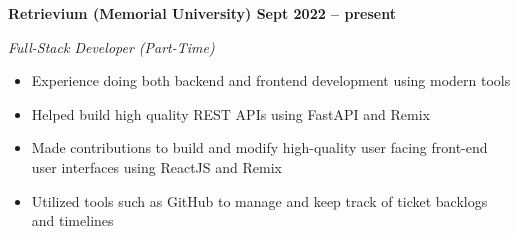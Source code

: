\vspace{0.1cm}
\textbf{Retrievium (Memorial University) \hfill Sept 2022 -- present} \par
\textit{Full-Stack Developer (Part-Time)} \par
\begin{itemize}
    \item Experience doing both backend and frontend development using modern tools
    \item Helped build high quality REST APIs using FastAPI and Remix
    \item Made contributions to build and modify high-quality user facing front-end user interfaces using ReactJS and Remix
    \item Utilized tools such as GitHub to manage and keep track of ticket backlogs and timelines
\end{itemize} \par